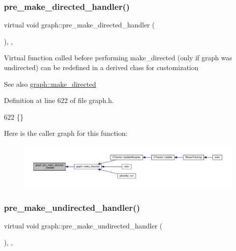 \subsubsection{\texorpdfstring{pre\+\_\+make\+\_\+directed\+\_\+handler()}{pre\_make\_directed\_handler()}}
{\footnotesize\ttfamily virtual void graph\+::pre\+\_\+make\+\_\+directed\+\_\+handler (\begin{DoxyParamCaption}{ }\end{DoxyParamCaption})\hspace{0.3cm}{\ttfamily [inline]}, {\ttfamily [virtual]}, {\ttfamily [inherited]}}

Virtual function called before performing make\+\_\+directed (only if graph was undirected) can be redefined in a derived class for customization

\begin{DoxySeeAlso}{See also}
\mbox{\hyperlink{classgraph_a1615678dee6248d6d8a00c553770b3bd}{graph\+::make\+\_\+directed}} 
\end{DoxySeeAlso}


Definition at line 622 of file graph.\+h.


\begin{DoxyCode}
622 \{\}
\end{DoxyCode}
Here is the caller graph for this function\+:
\nopagebreak
\begin{figure}[H]
\begin{center}
\leavevmode
\includegraphics[width=350pt]{classgraph_a505198f412b1e426e9d09b62ea9811e8_icgraph}
\end{center}
\end{figure}
\mbox{\label{classgraph_a8964107991e6f411ba8992f6b1deda21}} 
\subsubsection{\texorpdfstring{pre\+\_\+make\+\_\+undirected\+\_\+handler()}{pre\_make\_undirected\_handler()}}
{\footnotesize\ttfamily virtual void graph\+::pre\+\_\+make\+\_\+undirected\+\_\+handler (\begin{DoxyParamCaption}{ }\end{DoxyParamCaption})\hspace{0.3cm}{\ttfamily [inline]}, {\ttfamily [virtual]}, {\ttfamily [inherited]}}

